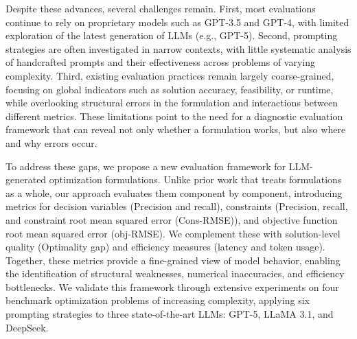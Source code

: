 \documentclass[review,12pt]{elsarticle}
\begin{document}
Despite these advances, several challenges remain. First, most evaluations continue to rely on proprietary models such as GPT-3.5 and GPT-4, with limited exploration of the latest generation of LLMs (e.g., GPT-5). Second, prompting strategies are often investigated in narrow contexts, with little systematic analysis of handcrafted prompts and their effectiveness across problems of varying complexity. Third, existing evaluation practices remain largely coarse-grained, focusing on global indicators such as solution accuracy, feasibility, or runtime, while overlooking structural errors in the formulation and interactions between different metrics. These limitations point to the need for a diagnostic evaluation framework that can reveal not only whether a formulation works, but also where and why errors occur.  

To address these gaps, we propose a new evaluation framework for LLM-generated optimization formulations. Unlike prior work that treats formulations as a whole, our approach evaluates them component by component, introducing metrics for decision variables (Precision and recall), constraints (Precision, recall, and constraint root mean squared error (Cons-RMSE)), and objective function root mean squared error (obj-RMSE). We complement these with solution-level quality (Optimality gap) and efficiency measures (latency and token usage). Together, these metrics provide a fine-grained view of model behavior, enabling the identification of structural weaknesses, numerical inaccuracies, and efficiency bottlenecks. We validate this framework through extensive experiments on four benchmark optimization problems of increasing complexity, applying six prompting strategies to three state-of-the-art LLMs: GPT-5, LLaMA 3.1, and DeepSeek. 
\end{document}
